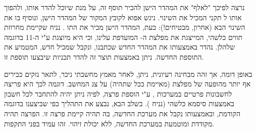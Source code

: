 נרצה לפיכך "לאלף" את המהדר הישן להכיר תוסף זה, על מנת שיוכל להדר אותו, ולהפוך
אותו ל תקני המכיל את השינוי. ניגש אפוא לקובץ המקור של המהדר הישן,
ונוסיף בו את השינוי הבא (אחרון, מבטיחים!): כעת, המהדר הישן מכיר את התו .
נניח שקיימת מחרוזת תווים כלשהי, המייצגת את מפלצת ה- המועדפת עלינו,
וכי היא מיוצגת ע"י ה-11 בדוגמה שלהלן. נהדר באמצעותו את המהדר החדש שכתבנו, ונקבל
  שמכיל  חדש, המטמיע את התוספת החדשה. ניתן
באמצעות תוצר זה להדר תכניות שיבצעו תוספת זו.

באופן דומה, אך זהה מבחינה רעיונית, ניתן, לאחר מאמץ מחשבתי ניכר, לתאר נזקים
כבירים אף יותר מהופעה של מפלצת (מאיימת ככל שתהיה) על צג המחשב. דוגמה לכך היא
פריצה לחשבונות פרטיים במערכות , ע"י הוספת פרצה, לפיה ניתן יהיה להתחבר
לכל חשבון באמצעות סיסמא כלשהי (נניח ). בשלב הבא, נבצע את
התהליך כפי שביצענו בדוגמה הקודמת, ובאמצעותו נקבל את מערכת  החדשה, בה
תהיה קיימת פרצה זו. הפרצה תהיה מקודדת ומוטמעת במערכת החדשה, ללא יכולת זיהוי.
זהו  עמיד בפני התקפות.

